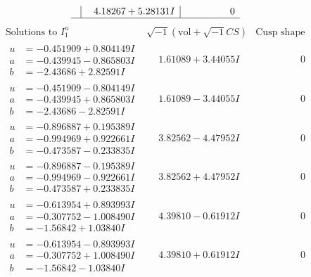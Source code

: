 \documentclass[1p]{elsarticle_modified}
\theoremstyle{definition}
\newcommand{\I}{\sqrt{-1}}
\begin{document}
$$\begin{array}{c|c|c}
 & \phantom{-}4.18267 + 5.28131 I & \phantom{-0.000000 } 0\\
 \hline 
 \end{array}$$\newpage$$\begin{array}{c|c|c}  
\text{Solutions to }I^u_{1}& \I (\text{vol} + \sqrt{-1}CS) & \text{Cusp shape}\\
 \hline 
\begin{aligned}
u &= -0.451909 + 0.804149 I \\
a &= -0.439945 - 0.865803 I \\
b &= -2.43686 + 2.82591 I\end{aligned}
 & \phantom{-}1.61089 + 3.44055 I & \phantom{-0.000000 } 0 \\ \hline\begin{aligned}
u &= -0.451909 - 0.804149 I \\
a &= -0.439945 + 0.865803 I \\
b &= -2.43686 - 2.82591 I\end{aligned}
 & \phantom{-}1.61089 - 3.44055 I & \phantom{-0.000000 } 0 \\ \hline\begin{aligned}
u &= -0.896887 + 0.195389 I \\
a &= -0.994969 + 0.922661 I \\
b &= -0.473587 - 0.233835 I\end{aligned}
 & \phantom{-}3.82562 - 4.47952 I & \phantom{-0.000000 } 0 \\ \hline\begin{aligned}
u &= -0.896887 - 0.195389 I \\
a &= -0.994969 - 0.922661 I \\
b &= -0.473587 + 0.233835 I\end{aligned}
 & \phantom{-}3.82562 + 4.47952 I & \phantom{-0.000000 } 0 \\ \hline\begin{aligned}
u &= -0.613954 + 0.893993 I \\
a &= -0.307752 - 1.008490 I \\
b &= -1.56842 + 1.03840 I\end{aligned}
 & \phantom{-}4.39810 - 0.61912 I & \phantom{-0.000000 } 0 \\ \hline\begin{aligned}
u &= -0.613954 - 0.893993 I \\
a &= -0.307752 + 1.008490 I \\
b &= -1.56842 - 1.03840 I\end{aligned}
 & \phantom{-}4.39810 + 0.61912 I & \phantom{-0.000000 } 0 \\ \hline\begin{aligned}

\end{aligned}
\end{array}$$
\end{document}
